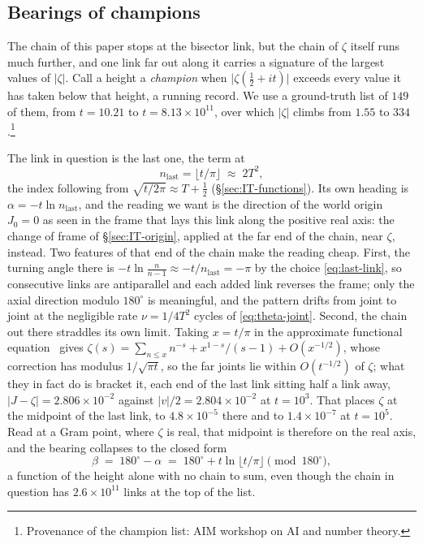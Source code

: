 \documentclass[11pt]{article}
\theoremstyle{definition}
\begin{document}
\subsection{Bearings of champions}\label{sec:champion-bearings}

The chain of this paper stops at the bisector link, but the chain of $\zeta$ itself runs
much further, and one link far out along it carries a signature of the largest
values of $|\zeta|$. Call a height a \emph{champion} when
$\bigl|\zeta(\tfrac12+it)\bigr|$ exceeds every value it has taken below that
height, a running record. We use a ground-truth list of $149$ of them, from
$t=10.21$ to $t=8.13\times10^{11}$, over which $|\zeta|$ climbs from $1.55$ to
$334$.\footnote{Provenance of the champion list: AIM workshop on AI and
number theory.}

The link in question is the last one, the term at
\begin{equation}\label{eq:last-link}
n_{\text{last}}=\lfloor t/\pi\rfloor\;\approx\;2T^{2},
\end{equation}
the index following from $\sqrt{t/2\pi}\approx T+\tfrac12$
(\S\ref{sec:IT-functions}). Its own
heading is $\alpha=-t\ln n_{\text{last}}$, and the reading we want is the
direction of the world origin $J_{0}=0$ as seen in the frame that lays this link
along the positive real axis: the change of frame of
\S\ref{sec:IT-origin}, applied at the far end of the chain, near $\zeta$,
instead. Two features of that end of the chain make the reading cheap. First, the
turning angle there is $-t\ln\frac{n}{n-1}\approx-t/n_{\text{last}}=-\pi$ by the
choice \eqref{eq:last-link}, so consecutive links are antiparallel and each added
link reverses the frame; only the axial direction modulo $180^{\circ}$ is
meaningful, and the pattern drifts from joint to joint at the negligible rate
$\nu=1/4T^{2}$ cycles of \eqref{eq:theta-joint}. Second, the chain out there
straddles its own limit. Taking $x=t/\pi$ in the approximate functional
equation~\cite[Thm.~4.11]{Titchmarsh1986} gives
$\zeta(s)=\sum_{n\leq x}n^{-s}+x^{1-s}/(s-1)+O(x^{-1/2})$, whose correction has
modulus $1/\sqrt{\pi t}$, so the far joints lie within $O(t^{-1/2})$ of $\zeta$;
what they in fact do is bracket it, each end of the last link sitting half a link
away, $|J-\zeta|=2.806\times10^{-2}$ against $|v|/2=2.804\times10^{-2}$ at
$t=10^{3}$. That places $\zeta$ at the midpoint of the last link, to
$4.8\times10^{-5}$ there and to $1.4\times10^{-7}$ at $t=10^{5}$. Read at a Gram
point, where $\zeta$ is real, that midpoint is therefore on the real axis, and the
bearing collapses to the closed form
\begin{equation}\label{eq:bearing}
\beta\;=\;180^{\circ}-\alpha\;=\;180^{\circ}+t\ln\lfloor t/\pi\rfloor
\pmod{180^{\circ}},
\end{equation}
a function of the height alone with no chain to sum, even though the chain in
question has $2.6\times10^{11}$ links at the top of the list.
\end{document}
